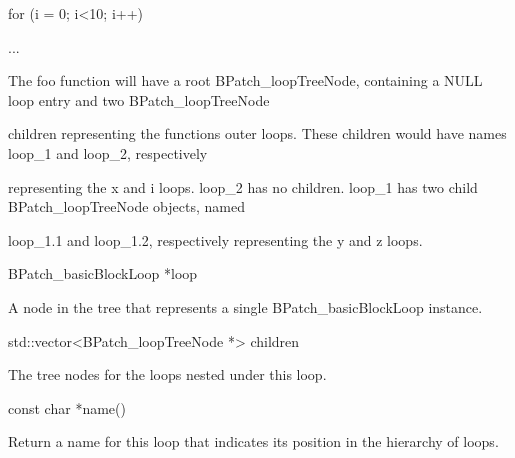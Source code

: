 {{{{

}}



{

for (i = 0; i<10; i++) {}



{

...}



{

}}



{

}





\bigskip



{

The foo function will have a root BPatch_loopTreeNode, containing a NULL loop entry and two BPatch_loopTreeNode

children representing the functions outer loops. These children would have names loop_1 and loop_2, respectively

representing the x and i loops. loop_2 has no children. loop_1 has two child BPatch_loopTreeNode objects, named

loop_1.1 and loop_1.2, respectively representing the y and z loops.



{

BPatch_basicBlockLoop *loop}



{

A node in the tree that represents a single BPatch_basicBlockLoop instance.}



{

std::vector<BPatch_loopTreeNode *> children}



{

The tree nodes for the loops nested under this loop.}



{

const char *name()}



{

Return a name for this loop that indicates its position in the hierarchy of loops.}



}}}
